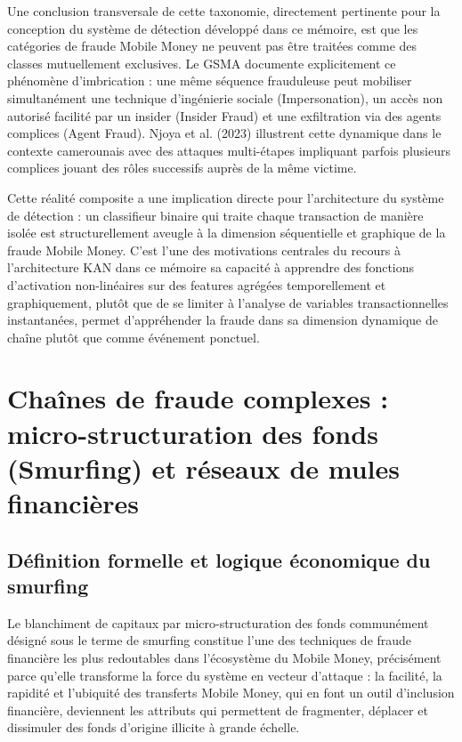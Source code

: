 \documentclass[11pt,a4paper,oneside]{report}
\theoremstyle{definition}
\theoremstyle{remark}
\begin{document}
Une conclusion transversale de cette taxonomie, directement pertinente pour la conception du système de détection développé dans ce mémoire, est que les catégories de fraude Mobile Money ne peuvent pas être traitées comme des classes mutuellement exclusives. Le GSMA documente explicitement ce phénomène d'imbrication : une même séquence frauduleuse peut mobiliser simultanément une technique d'ingénierie sociale (Impersonation), un accès non autorisé facilité par un insider (Insider Fraud) et une exfiltration via des agents complices (Agent Fraud). Njoya et al. (2023) illustrent cette dynamique dans le contexte camerounais avec des attaques multi-étapes impliquant parfois plusieurs complices jouant des rôles successifs auprès de la même victime.

Cette réalité composite a une implication directe pour l'architecture du système de détection : un classifieur binaire qui traite chaque transaction de manière isolée est structurellement aveugle à la dimension séquentielle et graphique de la fraude Mobile Money. C'est l'une des motivations centrales du recours à l'architecture KAN dans ce mémoire  sa capacité à apprendre des fonctions d'activation non-linéaires sur des features agrégées temporellement et graphiquement, plutôt que de se limiter à l'analyse de variables transactionnelles instantanées, permet d'appréhender la fraude dans sa dimension dynamique de chaîne plutôt que comme événement ponctuel.

\section{Chaînes de fraude complexes : micro-structuration des fonds (Smurfing) et réseaux de mules financières}

\subsection{Définition formelle et logique économique du smurfing}

Le blanchiment de capitaux par micro-structuration des fonds  communément désigné sous le terme de smurfing  constitue l'une des techniques de fraude financière les plus redoutables dans l'écosystème du Mobile Money, précisément parce qu'elle transforme la force du système en vecteur d'attaque : la facilité, la rapidité et l'ubiquité des transferts Mobile Money, qui en font un outil d'inclusion financière, deviennent les attributs qui permettent de fragmenter, déplacer et dissimuler des fonds d'origine illicite à grande échelle.
\end{document}
